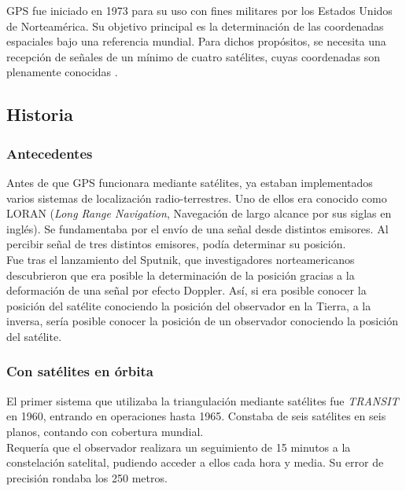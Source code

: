 
GPS fue iniciado en 1973 para su uso con fines militares por los Estados Unidos de Norteamérica. Su objetivo principal es la determinación de las coordenadas espaciales bajo una referencia mundial. Para dichos propósitos, se necesita una recepción de señales de un mínimo de cuatro satélites, cuyas coordenadas son plenamente conocidas \cite{huerta2005gps}.

\subsection{Historia}

\subsubsection{Antecedentes}
Antes de que GPS funcionara mediante satélites, ya estaban implementados varios sistemas de localización radio-terrestres. Uno de ellos era conocido como LORAN (\textit{Long Range Navigation}, Navegación de largo alcance por sus siglas en inglés). Se fundamentaba por el envío de una señal desde distintos emisores. Al percibir señal de tres distintos emisores, podía determinar su posición. \\

Fue tras el lanzamiento del Sputnik\footnotemark, que investigadores norteamericanos descubrieron que era posible la determinación de la posición gracias a la deformación de una señal por efecto Doppler. Así, si era posible conocer la posición del satélite conociendo la posición del observador en la Tierra, a la inversa, sería posible conocer la posición de un observador conociendo la posición del satélite.


\subsubsection{Con satélites en órbita}
El primer sistema que utilizaba la triangulación mediante satélites fue \textit{TRANSIT} en 1960, entrando en operaciones hasta 1965. Constaba de seis satélites en seis planos, contando con cobertura mundial. \\

Requería que el observador realizara un seguimiento de 15 minutos a la constelación satelital, pudiendo acceder a ellos cada hora y media. Su error de precisión rondaba los 250 metros.\\

